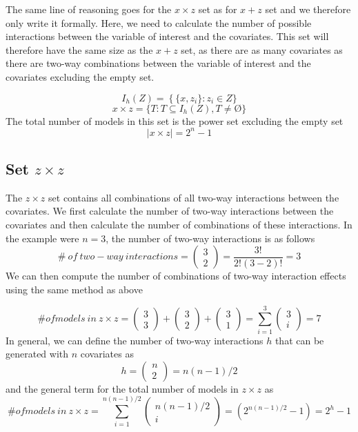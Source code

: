 The same line of reasoning goes for the $x \times z$ set as for $x + z$ set and we therefore only write it formally. Here, we need to calculate the number of possible interactions between the variable of interest and the covariates. This set will therefore have the same size as the $x + z$ set, as there are as many covariates as there are two-way combinations between the variable of interest and the covariates excluding the empty set.

\[I_h(Z)=\left.\left\{\{x,z_i\}\right.:z_i\in Z\right.\}\] 
\[x \times z=\left.\{T:T\subseteq I_h\left(Z\right),T\neq \textrm{\O}\right.\}\] 
The total number of models in this set is the power set excluding the empty set
\[\left|x \times z\right|\boldsymbol{=}2^n-1\] 

\subsection{Set $z \times z$}

The $z \times z$ set contains all combinations of all two-way interactions between the covariates. We first calculate the number of two-way interactions between the covariates and then calculate the number of combinations of these interactions. In the example were $n=3$, the number of two-way interactions is as follows
\[\#\ of\ two-way\ interactions=\left( \begin{array}{c}
3 \\ 
2 \end{array}
\right)=\frac{3!}{2!\left(3-2\right)!}=3\] 
We can then compute the number of combinations of two-way interaction effects using the same method as above 

\noindent 
\[\# of models\ in\ z \times z=\left( \begin{array}{c}
3 \\ 
3 \end{array}
\right)+\left( \begin{array}{c}
3 \\ 
2 \end{array}
\right)+\left( \begin{array}{c}
3 \\ 
1 \end{array}
\right)=\sum^3_{i=1}{\left( \begin{array}{c}
3 \\ 
i \end{array}
\right)}=7\] 
In general, we can define the number of two-way interactions $h$ that can be generated with $n$ covariates as
\[h=\left( \begin{array}{c}
n \\ 
2 \end{array}
\right)=n(n-1)/2\] 
and the general term for the total number of models in $z \times z$ as
\[\# of models\ in\ z \times z=\sum^{n(n-1)/2}_{i=1}{\left( \begin{array}{c}
n(n-1)/2 \\ 
i \end{array}
\right)}=(2^{n(n-1)/2}-1)=2^h-1\] 


